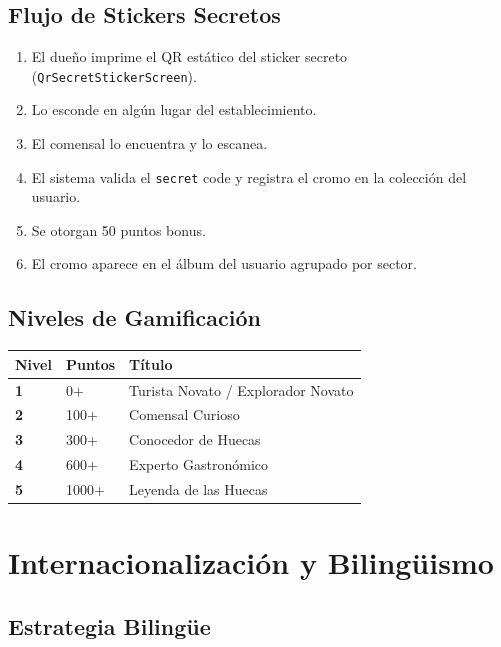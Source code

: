 \documentclass[11pt, a4paper, oneside]{report}
\begin{document}
\section{Flujo de Stickers Secretos}

\begin{enumerate}
  \item El dueño imprime el QR estático del sticker secreto (\texttt{QrSecretStickerScreen}).
  \item Lo esconde en algún lugar del establecimiento.
  \item El comensal lo encuentra y lo escanea.
  \item El sistema valida el \texttt{secret} code y registra el cromo en la colección del usuario.
  \item Se otorgan 50 puntos bonus.
  \item El cromo aparece en el álbum del usuario agrupado por sector.
\end{enumerate}

\section{Niveles de Gamificación}

\begin{longtable}{>{\bfseries}p{3cm} p{3cm} p{7cm}}
\toprule
\textbf{Nivel} & \textbf{Puntos} & \textbf{Título} \\
\midrule
1 & 0+ & Turista Novato / Explorador Novato \\
2 & 100+ & Comensal Curioso \\
3 & 300+ & Conocedor de Huecas \\
4 & 600+ & Experto Gastronómico \\
5 & 1000+ & Leyenda de las Huecas \\
\bottomrule
\end{longtable}

\chapter{Internacionalización y Bilingüismo}

\section{Estrategia Bilingüe}
\end{document}
